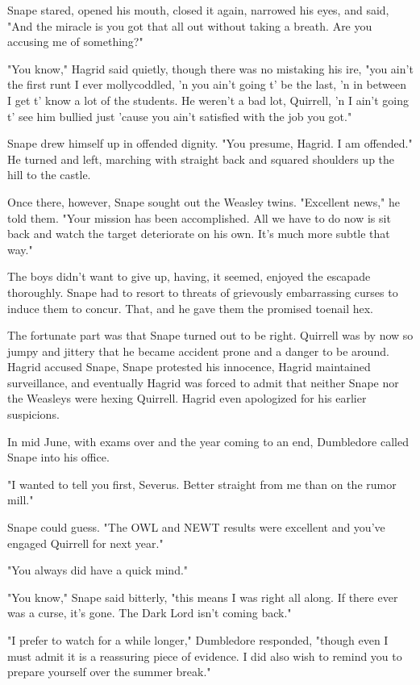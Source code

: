 \documentclass[a4paper,11pt]{article}
\begin{document}
Snape stared, opened his mouth, closed it again, narrowed his eyes, and said, "And the miracle is you got that all out without taking a breath. Are you accusing me of something?"

"You know," Hagrid said quietly, though there was no mistaking his ire, "you ain't the first runt I ever mollycoddled, 'n you ain't going t' be the last, 'n in between I get t' know a lot of the students. He weren't a bad lot, Quirrell, 'n I ain't going t' see him bullied just 'cause you ain't satisfied with the job you got."

Snape drew himself up in offended dignity. "You presume, Hagrid. I am offended." He turned and left, marching with straight back and squared shoulders up the hill to the castle.

Once there, however, Snape sought out the Weasley twins. "Excellent news," he told them. "Your mission has been accomplished. All we have to do now is sit back and watch the target deteriorate on his own. It's much more subtle that way."

The boys didn't want to give up, having, it seemed, enjoyed the escapade thoroughly. Snape had to resort to threats of grievously embarrassing curses to induce them to concur. That, and he gave them the promised toenail hex.

The fortunate part was that Snape turned out to be right. Quirrell was by now so jumpy and jittery that he became accident prone and a danger to be around. Hagrid accused Snape, Snape protested his innocence, Hagrid maintained surveillance, and eventually Hagrid was forced to admit that neither Snape nor the Weasleys were hexing Quirrell. Hagrid even apologized for his earlier suspicions.

In mid June, with exams over and the year coming to an end, Dumbledore called Snape into his office.

"I wanted to tell you first, Severus. Better straight from me than on the rumor mill."

Snape could guess. "The OWL and NEWT results were excellent and you've engaged Quirrell for next year."

"You always did have a quick mind."

"You know," Snape said bitterly, "this means I was right all along. If there ever was a curse, it's gone. The Dark Lord isn't coming back."

"I prefer to watch for a while longer," Dumbledore responded, "though even I must admit it is a reassuring piece of evidence. I did also wish to remind you to prepare yourself over the summer break."
\end{document}
